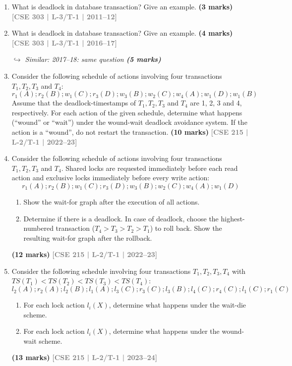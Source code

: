 \documentclass[12pt,a3paper]{article}
\newcommand{\yr}[1]{\hfill\textcolor{gray}{\small\textbf{[#1]}}}
\newcommand{\mk}[1]{\textcolor{orange!70!black}{\small\textbf{(#1 marks)}}}
\newcommand{\variant}[1]{\par\vspace{1pt}\textcolor{blue!50!black}%
  {\footnotesize\textit{$\hookrightarrow$ Similar: #1}}}
\begin{document}
\begin{enumerate}

\item What is deadlock in database transaction? Give an example.
\mk{3} \yr{CSE 303 | L-3/T-1 | 2011--12}

\item What is deadlock in database transaction? Give an example.
\mk{4} \yr{CSE 303 | L-3/T-1 | 2016--17}

\variant{2017--18: same question \mk{5}}

\item Consider the following schedule of actions involving four transactions $T_1, T_2, T_3$ and $T_4$:
\[r_1(A); r_2(B); w_1(C); r_3(D); w_3(B); w_2(C); w_4(A); w_1(D); w_1(B)\]
Assume that the deadlock-timestamps of $T_1, T_2, T_3$ and $T_4$ are 1, 2, 3 and 4, respectively. For each action of the given schedule, determine what happens (``wound'' or ``wait'') under the wound-wait deadlock avoidance system. If the action is a ``wound'', do not restart the transaction.
  \mk{10} \yr{CSE 215 | L-2/T-1 | 2022--23}

\item Consider the following schedule of actions involving four transactions $T_1, T_2, T_3$ and $T_4$. Shared locks are requested immediately before each read action and exclusive locks immediately before every write action:
\[r_1(A); r_2(B); w_1(C); r_3(D); w_3(B); w_2(C); w_4(A); w_1(D)\]
\begin{enumerate}
  \item Show the wait-for graph after the execution of all actions.
  \item Determine if there is a deadlock. In case of deadlock, choose the highest-numbered transaction ($T_4 > T_3 > T_2 > T_1$) to roll back. Show the resulting wait-for graph after the rollback.
\end{enumerate}
  \mk{12} \yr{CSE 215 | L-2/T-1 | 2022--23}

\item Consider the following schedule involving four transactions $T_1, T_2, T_3, T_4$ with $TS(T_1) < TS(T_2) < TS(T_3) < TS(T_4)$:
\[l_2(A); r_2(A); l_2(B); l_1(A); l_3(C); r_3(C); l_3(B); l_4(C); r_4(C); l_1(C); r_1(C)\]
\begin{enumerate}
  \item For each lock action $l_i(X)$, determine what happens under the wait-die scheme.
  \item For each lock action $l_i(X)$, determine what happens under the wound-wait scheme.
\end{enumerate}
  \mk{13} \yr{CSE 215 | L-2/T-1 | 2023--24}


\end{enumerate}
\end{document}
